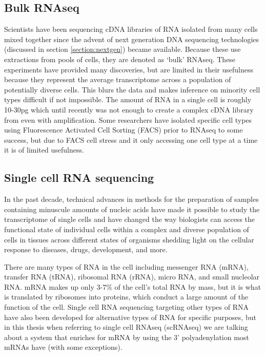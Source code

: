\subsection{Bulk RNAseq}
\par{
Scientists have been sequencing cDNA libraries of RNA isolated from many cells mixed together since the advent of next generation DNA sequencing technologies (discussed in section \ref{section:nextgen}) became available\cite{RNAseq1}\cite{RNAseq2}. Because these use extractions from pools of cells, they are denoted as `bulk' RNAseq. These experiments have provided many discoveries, but are limited in their usefulness because they represent the average transcriptome across a population of potentially diverse cells. This blurs the data and makes inference on minority cell types difficult if not impossible. The amount of RNA in a single cell is roughly 10-30pg\cite{howmuchrna} which until recently was not enough to create a complex cDNA library from even with amplification. Some researchers have isolated specific cell types using Fluorescence Activated Cell Sorting (FACS)\cite{FACspatent}\cite{FACs} prior to RNAseq to some success\cite{FACszebra}, but due to FACS cell stress and it only accessing one cell type at a time it is of limited usefulness.
}

\subsection{Single cell RNA sequencing}

\par{
In the past decade, technical advances in methods for the preparation of samples containing minuscule amounts of nucleic acids have made it possible to study the transcriptome of single cells\cite{first_singlecell} and have changed the way biologists can access the functional state of individual cells within a complex and diverse population of cells in tissues across different states of organisms shedding light on the cellular response to diseases, drugs, development, and more.
} \\
\par{
There are many types of RNA in the cell including messenger RNA (mRNA), transfer RNA (tRNA), ribosomal RNA (rRNA), micro RNA, and small nucleolar RNA. mRNA makes up only 3-7\% of the cell's total RNA by mass\cite{rnacontent}, but it is what is translated by ribosomes into proteins, which conduct a large amount of the function of the cell. Single cell RNA sequencing targeting other types of RNA have also been developed for alternative types of RNA for specific purposes\cite{nonmRNASC}, but in this thesis when referring to single cell RNAseq (scRNAseq) we are talking about a system that enriches for mRNA by using the 3' polyadenylation most mRNAs have (with some exceptions\cite{nonpoly}).
}

